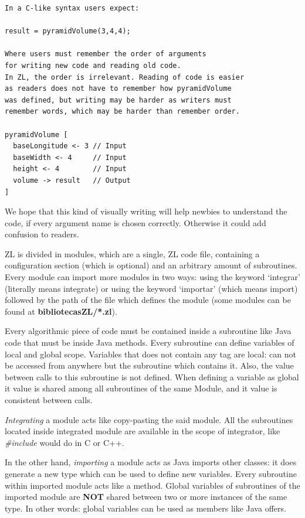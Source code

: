 \documentclass{report}
\begin{document}
	\vspace{10px}
	
\begin{BVerbatim}
In a C-like syntax users expect:

result = pyramidVolume(3,4,4);

Where users must remember the order of arguments 
for writing new code and reading old code.
In ZL, the order is irrelevant. Reading of code is easier
as readers does not have to remember how pyramidVolume
was defined, but writing may be harder as writers must
remember words, which may be harder than remember order.

pyramidVolume [
  baseLongitude <- 3 // Input 
  baseWidth <- 4     // Input
  height <- 4        // Input
  volume -> result   // Output
]
\end{BVerbatim}

	\vspace{10px}

	We hope that this kind of visually writing will help newbies to understand the code, if every argument name is chosen correctly. Otherwise it could add confusion to readers.

	ZL is divided in modules, which are a single, ZL code file, containing a configuration section (which is optional) and an arbitrary amount of subroutines. Every module can import more modules in two ways: using the keyword `integrar' (literally means integrate) or using the keyword `importar' (which means import) followed by the path of the file which defines the module (some modules can be found at \textbf{bibliotecasZL/*.zl}).
	
	Every algorithmic piece of code must be contained inside a subroutine like Java code that must be inside Java methods. Every subroutine can define variables of local and global scope. Variables that does not contain any tag are local: can not be accessed from anywhere but the subroutine which contains it. Also, the value between calls to this subroutine is not defined. When defining a variable as global it value is shared among all subroutines of the same Module, and it value is consistent between calls.  
	
	\textit{Integrating} a module acts like copy-pasting the said module. All the subroutines located inside integrated module are available in the scope of integrator, like \textit{\#include} would do in C or C++.
	
	In the other hand, \textit{importing} a module acts as Java imports other classes: it does generate a new type which can be used to define new variables. Every subroutine within imported module acts like a method. Global variables of subroutines of the imported module are \textbf{NOT} shared between two or more instances of the same type. In other words: global variables can be used as members like Java offers. 
	
\end{document}
